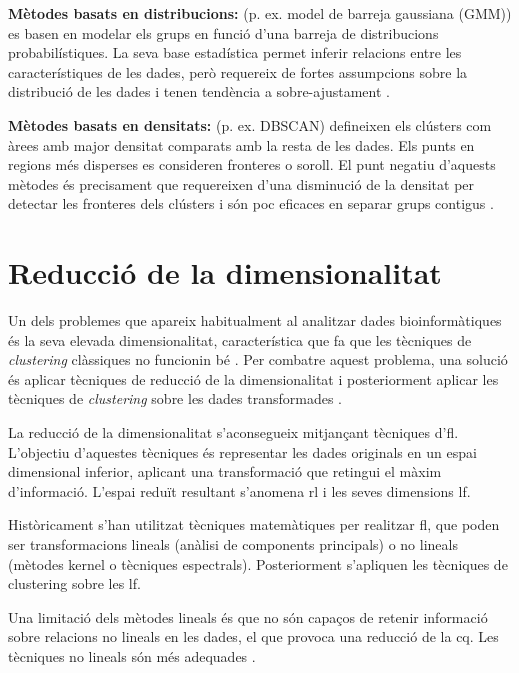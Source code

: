 \documentclass[CAT,BIB]{TFUOC}%
\begin{document}
        \textbf{Mètodes basats en distribucions:} (p. ex. model de barreja gaussiana (GMM)) es basen en modelar els grups en funció d'una barreja de distribucions probabilístiques. La seva base estadística permet inferir relacions entre les característiques de les dades, però requereix de fortes assumpcions sobre la distribució de les dades i tenen tendència a sobre-ajustament \citep{Karim2021}.

        \textbf{Mètodes basats en densitats:} (p. ex. DBSCAN) defineixen els clústers com àrees amb major densitat comparats amb la resta de les dades. Els punts en regions més disperses es consideren fronteres o soroll. El punt negatiu d'aquests mètodes és precisament que requereixen d'una disminució de la densitat per detectar les fronteres dels clústers i són poc eficaces en separar grups contigus \citep{Karim2021}.

    \section{Reducció de la dimensionalitat}
    \label{s:state_reduccio}

        Un dels problemes que apareix habitualment al analitzar dades bioinformàtiques és la seva elevada dimensionalitat, característica que fa que les tècniques de \textit{clustering} clàssiques no funcionin bé \citep{Masood2015, Karim2021}. Per combatre aquest problema, una solució és aplicar tècniques de reducció de la dimensionalitat i posteriorment aplicar les tècniques de \textit{clustering} sobre les dades transformades \citep{Min2018, Masood2015}.

        La reducció de la dimensionalitat s'aconsegueix mitjançant tècniques d'\gls{fl}. L'objectiu d'aquestes tècniques és representar les dades originals en un espai dimensional inferior, aplicant una transformació que retingui el màxim d'informació. L'espai reduït resultant s'anomena \gls{rl} i les seves dimensions \gls{lf}.

        Històricament s'han utilitzat tècniques matemàtiques per realitzar \gls{fl}, que poden ser transformacions lineals (anàlisi de components principals) o no lineals (mètodes kernel o tècniques espectrals). Posteriorment s'apliquen les tècniques de clustering sobre les \gls{lf}.

        Una limitació dels mètodes lineals és que no són capaços de retenir informació sobre relacions no lineals en les dades, el que provoca una reducció de la \gls{cq}. Les tècniques no lineals són més adequades \citep{Karim2021}.
\end{document}
